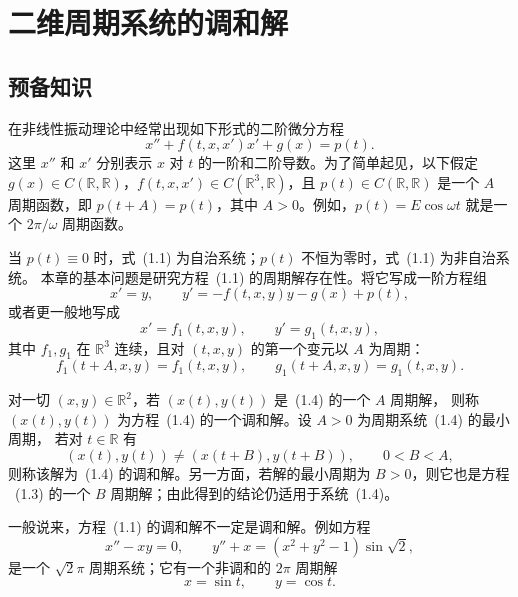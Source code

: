 
\setchapterimage{}
\setchapterintro{}
\chapter{二维周期系统的调和解}

\newcommand{\chSixFigurePlaceholder}[1]{%
  \begin{center}
    \fbox{\parbox{0.72\textwidth}{\centering\vspace{2.4cm}图~#1\\（图片占位）\vspace{2.4cm}}}
  \end{center}%
}

\section{预备知识}

在非线性振动理论中经常出现如下形式的二阶微分方程
\[
  x''+f(t,x,x')x'+g(x)=p(t). \tag{1.1}
\]
这里 $x''$ 和 $x'$ 分别表示 $x$ 对 $t$ 的一阶和二阶导数。为了简单起见，以下假定
$g(x)\in C(\mathbb R,\mathbb R)$，$f(t,x,x')\in C(\mathbb R^3,\mathbb R)$，且
$p(t)\in C(\mathbb R,\mathbb R)$ 是一个 $A$ 周期函数，即 $p(t+A)=p(t)$，其中
$A>0$。例如，$p(t)=E\cos\omega t$ 就是一个 $2\pi/\omega$ 周期函数。

当 $p(t)\equiv0$ 时，式~(1.1) 为自治系统；$p(t)$ 不恒为零时，式~(1.1) 为非自治系统。
本章的基本问题是研究方程~(1.1) 的周期解存在性。将它写成一阶方程组
\[
  x'=y,\qquad y'=-f(t,x,y)y-g(x)+p(t), \tag{1.3}
\]
或者更一般地写成
\[
  x'=f_1(t,x,y),\qquad y'=g_1(t,x,y), \tag{1.4}
\]
其中 $f_1,g_1$ 在 $\mathbb R^3$ 连续，且对 $(t,x,y)$ 的第一个变元以 $A$ 为周期：
\[
  f_1(t+A,x,y)=f_1(t,x,y),\qquad g_1(t+A,x,y)=g_1(t,x,y).
\]

对一切 $(x,y)\in\mathbb R^2$，若 $(x(t),y(t))$ 是~(1.4) 的一个 $A$ 周期解，
则称 $(x(t),y(t))$ 为方程~(1.4) 的一个调和解。设 $A>0$ 为周期系统~(1.4) 的最小周期，
若对 $t\in\mathbb R$ 有
\[
  (x(t),y(t))\ne(x(t+B),y(t+B)),\qquad 0<B<A,
\]
则称该解为~(1.4) 的调和解。另一方面，若解的最小周期为 $B>0$，则它也是方程
~(1.3) 的一个 $B$ 周期解；由此得到的结论仍适用于系统~(1.4)。

一般说来，方程~(1.1) 的调和解不一定是调和解。例如方程
\[
  x''-xy=0,\qquad y''+x=(x^2+y^2-1)\sin\sqrt2,
\]
是一个 $\sqrt2\pi$ 周期系统；它有一个非调和的 $2\pi$ 周期解
\[
  x=\sin t,\qquad y=\cos t.
\]

